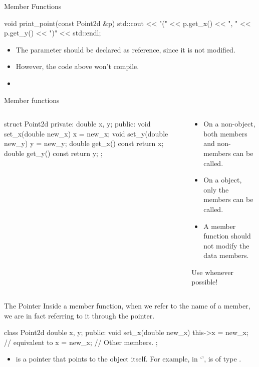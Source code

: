 \documentclass{beamer}
\begin{document}
\begin{frame}[fragile]{\const Member Functions}
    \begin{cpp}
void print_point(const Point2d &p) {
  std::cout << "(" << p.get_x() << ", "
            << p.get_y() << ")" << std::endl;
}
    \end{cpp}
    \begin{itemize}
        \item The parameter should be declared as \const reference, since it is not modified.
        \item However, the code above won't compile.
        \item {}
    \end{itemize}
\end{frame}

\begin{frame}[fragile]{\const Member functions}
    \begin{columns}
        \begin{column}{0.5\linewidth}
            \begin{cpp}
struct Point2d {
 private:
  double x, y;
 public:
  void set_x(double new_x)
    { x = new_x; }
  void set_y(double new_y)
    { y = new_y; }
  double get_x() const
    { return x; }
  double get_y() const
    { return y; }
};
            \end{cpp}        
        \end{column}
        \begin{column}{0.5\linewidth}
            \begin{itemize}
                \item On a non-\const object, both \const members and non-\const members can be called.
                \item On a \const object, only the \const members can be called.
                \item A \const member function should not modify the data members.
            \end{itemize}
            Use \const whenever possible!
        \end{column}
    \end{columns}
\end{frame}

\begin{frame}[fragile]{The \this Pointer}
    Inside a member function, when we refer to the name of a member, we are in fact referring to it through the \this pointer.
    \begin{cpp}
class Point2d {
  double x, y;
 public:
  void set_x(double new_x) {
    this->x = new_x;    // equivalent to x = new_x;
  }
  // Other members.
};
    \end{cpp}
    \begin{itemize}
        \item \this is a pointer that points to the object itself. For example, in `', \this is of type .
    \end{itemize}
\end{frame}
\end{document}
